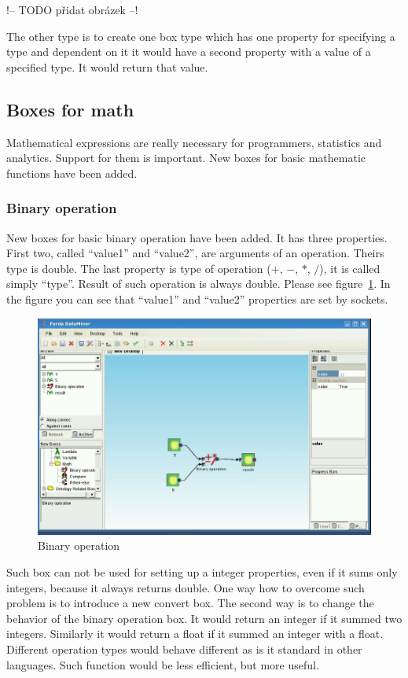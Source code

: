 \documentclass[a4paper,12pt]{book}
\begin{document}
!-- TODO přidat obrázek --!

The other type is to create one box type which has one property for specifying a type and dependent on it it would have a second property with a value of a specified type. It would return that value.

\subsection{Boxes for math}
Mathematical expressions are really necessary for programmers, statistics and analytics. Support for them is important. New boxes for basic mathematic functions have been added.

\subsubsection{Binary operation}
New boxes for basic binary operation have been added. It has three properties. First two, called ``value1'' and ``value2'', are arguments of an operation. Theirs type is double. The last property is type of operation ($+$, $-$, $*$, $/$), it is called simply ``type''. Result of such operation is always double. Please see figure~\ref{fig:boxBinaryOperation}. In the figure you can see that ``value1'' and ``value2'' properties are set by sockets.
\begin{figure}
	\includegraphics[width=1\textwidth]{binaryOperation2.png}
	\caption{Binary operation}
	\label{fig:boxBinaryOperation}
\end{figure}

Such box can not be used for setting up a integer properties, even if it sums only integers, because it always returns double. One way how to overcome such problem is to introduce a new convert box. The second way is to change the behavior of the binary operation box. It would return an integer if it summed two integers. Similarly it would return a float if it summed an integer with a float. Different operation types would behave different as is it standard in other languages. Such function would be less efficient, but more useful.  
\end{document}
